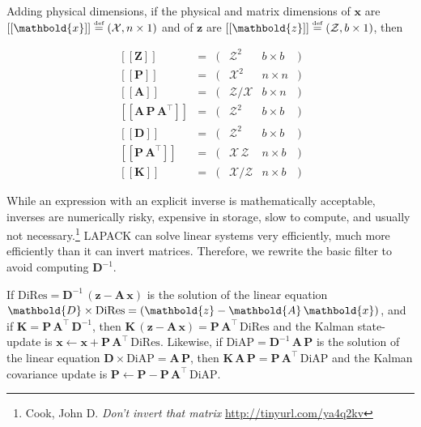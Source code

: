 \documentclass[10pt,oneside,x11names]{article}
\begin{document}
Adding physical dimensions, if the physical and matrix dimensions of
\(\mathbold{x}\)
are
\(\left[\left[\mathbold{x}\right]\right]
\stackrel{\text{\tiny def}}{=}
(\mathcal{X}, n\times{1})\)
and of
\(\mathbold{z}\)
are
\(\left[\left[\mathbold{z}\right]\right]
\stackrel{\text{\tiny def}}{=}
(\mathcal{Z}, b\times{1})\), then

\begin{equation*}
\label{eqn:dimensional-breakdown}
\begin{array}{lccccr}
\left[\left[\mathbold{Z}\right]\right]                                       &=& (&\mathcal{Z}^2            & b\times{b}&) \\
\left[\left[\mathbold{P}\right]\right]                                       &=& (&\mathcal{X}^2            & n\times{n}&) \\
\left[\left[\mathbold{A}\right]\right]                                       &=& (&\mathcal{Z}/\mathcal{X}  & b\times{n}&) \\
\left[\left[\mathbold{A}\,\mathbold{P}\,\mathbold{A}^\intercal\right]\right] &=& (&\mathcal{Z}^2            & b\times{b}&) \\
\left[\left[\mathbold{D}\right]\right]                                       &=& (&\mathcal{Z}^2            & b\times{b}&) \\
\left[\left[\mathbold{P}\,\mathbold{A}^\intercal\right]\right]               &=& (&\mathcal{X}\,\mathcal{Z} & n\times{b}&) \\
\left[\left[\mathbold{K}\right]\right]                                       &=& (&\mathcal{X}/\mathcal{Z}  & n\times{b}&)
\end{array}
\end{equation*}

While an expression with an explicit inverse is mathematically acceptable,
inverses are numerically risky, expensive in storage, slow to compute, and
usually not necessary.\footnote{Cook, John D. \emph{Don't invert that matrix} \url{http://tinyurl.com/ya4q2kv}} LAPACK can solve linear systems very
efficiently, much more efficiently than it can invert matrices.
Therefore, we rewrite the basic filter to avoid computing
\(\mathbold{D}^{-1}\).

If
\(\textrm{DiRes}=\mathbold{D}^{-1}\,(\mathbold{z}-\mathbold{A}\,\mathbold{x})\)
is the solution of the linear equation
\(\mathbold{D}\times\textrm{\textrm{DiRes}}=(\mathbold{z}-\mathbold{A}\,\mathbold{x})\), and if
\(\mathbold{K}=\mathbold{P}\,\mathbold{A}^\intercal\,\mathbold{D}^{-1}\), then
\(\mathbold{K}\,(\mathbold{z}-\mathbold{A}\,\mathbold{x})=\mathbold{P}\,\mathbold{A}^\intercal\,\textrm{DiRes}\)
and the Kalman state-update is \(\mathbold{x}\leftarrow\mathbold{x}+\mathbold{P}\,\mathbold{A}^\intercal\,\textrm{DiRes}\).
Likewise, if \(\textrm{DiAP}=\mathbold{D}^{-1}\,\mathbold{A}\,\mathbold{P}\) is
the solution of the linear equation
\(\mathbold{D}\times\textrm{DiAP}=\mathbold{A}\,\mathbold{P}\), then
\(\mathbold{K}\,\mathbold{A}\,\mathbold{P}=\mathbold{P}\,\mathbold{A}^\intercal\,\textrm{DiAP}\)
and the Kalman covariance update is \(\mathbold{P}\leftarrow\mathbold{P}-\mathbold{P}\,\mathbold{A}^\intercal\,\textrm{DiAP}\).
\end{document}
